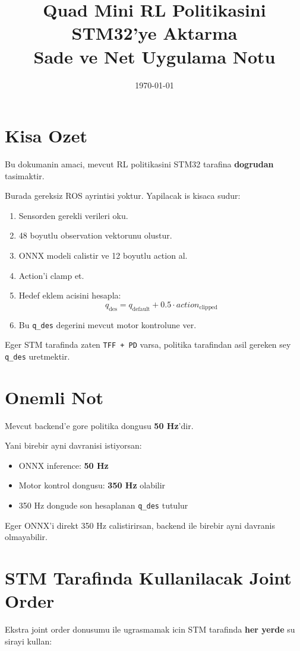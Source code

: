 \documentclass[11pt,a4paper]{article}
\title{Quad Mini RL Politikasini STM32'ye Aktarma\\Sade ve Net Uygulama Notu}
\author{}
\date{\today}
\begin{document}
\maketitle

\section{Kisa Ozet}
Bu dokumanin amaci, mevcut RL politikasini STM32 tarafina \textbf{dogrudan} tasimaktir.

Burada gereksiz ROS ayrintisi yoktur. Yapilacak is kisaca sudur:
\begin{enumerate}
  \item Sensorden gerekli verileri oku.
  \item 48 boyutlu observation vektorunu olustur.
  \item ONNX modeli calistir ve 12 boyutlu action al.
  \item Action'i clamp et.
  \item Hedef eklem acisini hesapla:
  \[
  q_{\mathrm{des}} = q_{\mathrm{default}} + 0.5 \cdot action_{\mathrm{clipped}}
  \]
  \item Bu \texttt{q\_des} degerini mevcut motor kontrolune ver.
\end{enumerate}

\noindent
Eger STM tarafinda zaten \texttt{TFF + PD} varsa, politika tarafindan asil gereken sey \texttt{q\_des} uretmektir.

\section{Onemli Not}
Mevcut backend'e gore politika dongusu \textbf{50 Hz}'dir.

Yani birebir ayni davranisi istiyorsan:
\begin{itemize}
  \item ONNX inference: \textbf{50 Hz}
  \item Motor kontrol dongusu: \textbf{350 Hz} olabilir
  \item 350 Hz dongude son hesaplanan \texttt{q\_des} tutulur
\end{itemize}

\noindent
Eger ONNX'i direkt 350 Hz calistirirsan, backend ile birebir ayni davranis olmayabilir.

\section{STM Tarafinda Kullanilacak Joint Order}
Ekstra joint order donusumu ile ugrasmamak icin STM tarafinda \textbf{her yerde} su sirayi kullan:
\end{document}
